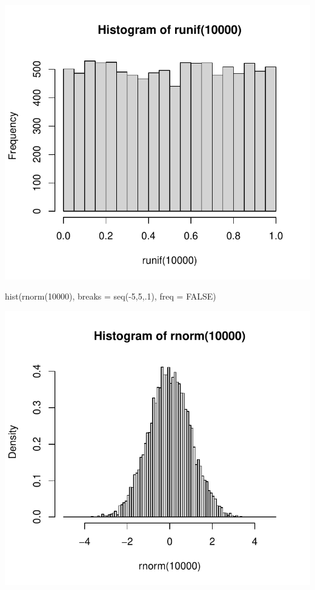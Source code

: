 \documentclass[
]{article}
\newenvironment{Shaded}{\begin{snugshade}}{\end{snugshade}}
\newcommand{\AttributeTok}[1]{\textcolor[rgb]{0.77,0.63,0.00}{#1}}
\newcommand{\ConstantTok}[1]{\textcolor[rgb]{0.00,0.00,0.00}{#1}}
\newcommand{\DecValTok}[1]{\textcolor[rgb]{0.00,0.00,0.81}{#1}}
\newcommand{\FunctionTok}[1]{\textcolor[rgb]{0.00,0.00,0.00}{#1}}
\newcommand{\NormalTok}[1]{#1}
\newcommand{\SpecialCharTok}[1]{\textcolor[rgb]{0.00,0.00,0.00}{#1}}
\begin{document}
\includegraphics{DistNormal_files/figure-latex/unnamed-chunk-12-1.pdf}

\begin{Shaded}
\begin{Highlighting}[]
\FunctionTok{hist}\NormalTok{(}\FunctionTok{rnorm}\NormalTok{(}\DecValTok{10000}\NormalTok{), }\AttributeTok{breaks =} \FunctionTok{seq}\NormalTok{(}\SpecialCharTok{{-}}\DecValTok{5}\NormalTok{,}\DecValTok{5}\NormalTok{,.}\DecValTok{1}\NormalTok{),}
     \AttributeTok{freq =} \ConstantTok{FALSE}\NormalTok{)}
\end{Highlighting}
\end{Shaded}

\includegraphics{DistNormal_files/figure-latex/unnamed-chunk-13-1.pdf}
\end{document}
